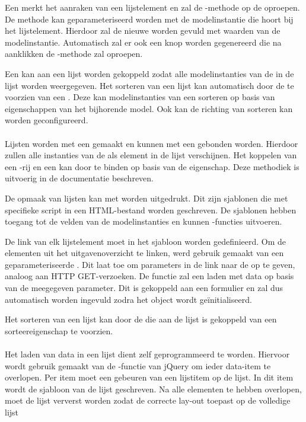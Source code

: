 Een  merkt het aanraken van een lijstelement en zal de -methode op de  oproepen.
De methode kan geparameteriseerd worden met de modelinstantie die hoort bij het lijstelement.
Hierdoor zal de nieuwe  worden gevuld met waarden van de modelinstantie.
Automatisch zal er ook een  knop worden gegenereerd die na aanklikken de -methode zal oproepen.

Een  kan aan een lijst worden gekoppeld zodat alle modelinstanties van de  in de lijst worden weergegeven.
Het sorteren van een lijst kan automatisch door de  te voorzien van een .
Deze kan modelinstanties van een  sorteren op basis van eigenschappen van het bijhorende model.
Ook kan de richting van sorteren kan worden geconfigureerd.

\paragraph{\kendo}
Lijsten worden met een  gemaakt en kunnen met een  gebonden worden.
Hierdoor zullen alle instanties van de  als element in de lijst verschijnen.
Het koppelen van een \js-rij en een  kan door te binden op basis van de  eigenschap.
Deze methodiek is uitvoerig in de documentatie beschreven.

De opmaak van lijsten kan met  worden uitgedrukt.
Dit zijn sjablonen die met specifieke script in een HTML-bestand worden geschreven.
De sjablonen hebben toegang tot de velden van de modelinstanties en kunnen \js-functies uitvoeren.

De link van elk lijstelement moet in het sjabloon worden gedefinieerd.
Om de elementen uit het uitgavenoverzicht te linken, werd gebruik gemaakt van een geparameteriseerde .
Dit laat toe om parameters in de link naar de  op te geven,  analoog aan HTTP GET-verzoeken.
De functie zal een  laden met data op basis van de meegegeven parameter.
Dit  is gekoppeld aan een formulier en zal dus automatisch worden ingevuld zodra het object wordt geïnitialiseerd.

Het sorteren van een lijst kan door de  die aan de lijst is gekoppeld van een sorteereigenschap te voorzien.

\paragraph{\jqm}
Het laden van data in een lijst dient zelf geprogrammeerd te worden.
Hiervoor wordt gebruik gemaakt van de -functie van jQuery om ieder data-item te overlopen.
Per item moet een  gebeuren van een lijstitem op de lijst.
In dit item wordt de sjabloon van de lijst geschreven.
Na alle elementen te hebben overlopen, moet de lijst ververst worden zodat \jqm{} de correcte lay-out toepast op de volledige lijst

